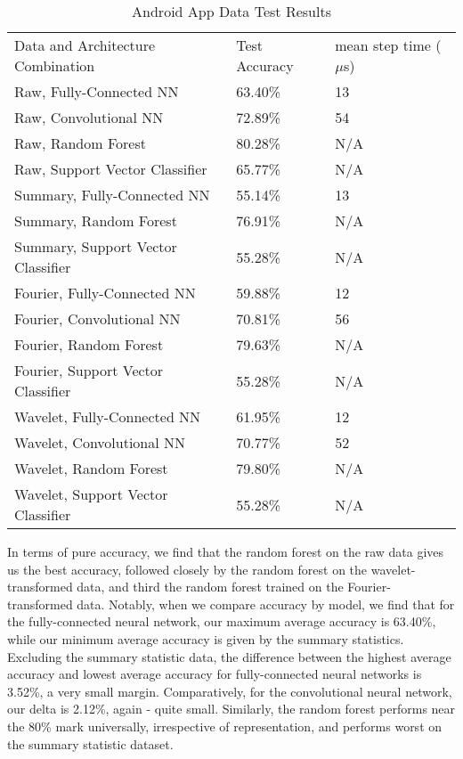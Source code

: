 \begin{table}[ht]
\caption{Android App Data Test Results}
\centering
\label{Tab:test}	
\begin{tabular}{lll}
Data and Architecture Combination & Test Accuracy & mean step time ($\mu$s) \\
Raw, Fully-Connected NN            & 63.40\%         & 13\\
Raw, Convolutional NN              & 72.89\%         & 54\\
Raw, Random Forest                 & 80.28\%         & N/A\\ 
Raw, Support Vector Classifier     & 65.77\%         & N/A\\    
Summary, Fully-Connected NN        & 55.14\%         & 13\\
Summary, Random Forest             & 76.91\%         & N/A\\
Summary, Support Vector Classifier & 55.28\%         & N/A\\  
Fourier, Fully-Connected NN        & 59.88\%         & 12\\
Fourier, Convolutional NN          & 70.81\%         & 56\\
Fourier, Random Forest             & 79.63\%         & N/A\\
Fourier, Support Vector Classifier & 55.28\%         & N/A\\  
Wavelet, Fully-Connected NN        & 61.95\%         & 12\\
Wavelet, Convolutional NN          & 70.77\%         & 52\\
Wavelet, Random Forest             & 79.80\%         & N/A\\
Wavelet, Support Vector Classifier & 55.28\%         & N/A           
\end{tabular}
\end{table}

In terms of pure accuracy, we find that the random forest on the raw data gives us the best accuracy, followed closely by the random forest on the wavelet-transformed data, and third the random forest trained on the Fourier-transformed data. 
Notably, when we compare accuracy by model, we find that for the fully-connected neural network, our maximum average accuracy is 63.40\%, while our minimum average accuracy is given by the summary statistics.
Excluding the summary statistic data, the difference between the highest average accuracy and lowest average accuracy for fully-connected neural networks is 3.52\%, a very small margin. 
Comparatively, for the convolutional neural network, our delta is 2.12\%, again - quite small. 
Similarly, the random forest performs near the 80\% mark universally, irrespective of representation, and performs worst on the summary statistic dataset. 
